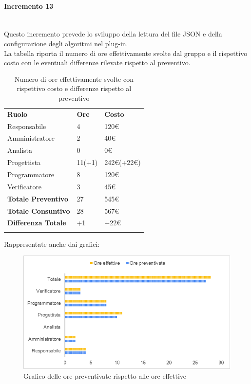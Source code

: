 \paragraph{Incremento 13} \mbox{} \\
Questo incremento prevede lo sviluppo della lettura del file JSON e della configurazione degli algoritmi nel plug-in. \\
La tabella riporta il numero di ore effettivamente svolte dal gruppo e il rispettivo costo con le eventuali differenze rilevate rispetto al preventivo.
\begin{longtable} {							
		>{}p{40mm}  
		>{}p{20mm}	
		>{}p{28mm}			
	}			
	\rowcolor{gray!50}
	
	\textbf{Ruolo}            & \textbf{Ore} & \textbf{Costo}       \TBstrut \\
	Responsabile              & 4            & 120\euro    \TBstrut \\
	Amministratore            & 2            & 40\euro              \TBstrut \\
	Analista                  & 0            & 0\euro               \TBstrut \\
	Progettista               & 11(+1)       & 242\euro(+22\euro)   \TBstrut \\
	Programmatore             & 8            & 120\euro             \TBstrut \\
	Verificatore              & 3            & 45\euro              \TBstrut \\
	\textbf{Totale Preventivo}& 27           & 545\euro             \TBstrut \\	
	\textbf{Totale Consuntivo}& 28           & 567\euro             \TBstrut \\	
	\textbf{Differenza Totale}& +1           & +22\euro              \TBstrut \\
	\rowcolor{white}
	\caption{Numero di ore effettivamente svolte con rispettivo costo e differenze rispetto al preventivo}	
\end{longtable}

Rappresentate anche dai grafici:
\begin{figure} [H]
	\includegraphics[width=\linewidth]{./img/Grafici/37.png}
	\caption{Grafico delle ore preventivate rispetto alle ore effettive}
\end{figure}


